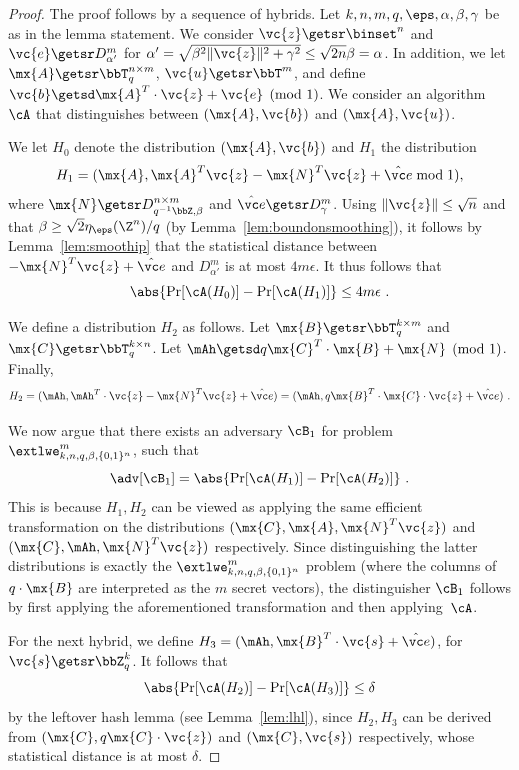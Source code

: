 \begin{proof}
The proof follows by a sequence of hybrids. 
Let $k,n,m,q,\eps, \alpha, \beta, \gamma$ be as in the lemma statement. 
We consider $\vc{z} \getsr \binset^n$ and $\vc{e} \getsr D_{\alpha'}^m$ for $\alpha' = \sqrt{\beta^2\|\vc{z}\|^2+ \gamma^2} \le \sqrt{2n}\beta=\alpha$. In addition, we let $\mx{A}\getsr \bbT_q^{n \times m}$, $\vc{u} \getsr \bbT^m$, and define $\vc{b} \getsd \mx{A}^T\cdot\vc{z}+\vc{e}\pmod{1}$. We consider an algorithm~$\cA$ that distinguishes between $(\mx{A}, \vc{b})$ and $(\mx{A}, \vc{u})$.

We let $H_0$ denote the distribution $(\mx{A}, \vc{b})$ and $H_1$ the distribution 
\[ H_1 = (\mx{A}, \mx{A}^T\vc{z}-\mx{N}^T\vc{z}+\veh \bmod 1 ),\]
where $\mx{N}\getsr D^{n \times m}_{q^{-1}\bbZ, \beta}$ and $\veh \getsr D_{\gamma}^m$.
Using $\| \vc{z} \| \le \sqrt{n}$ and that $\beta \ge \sqrt{2} \eta_\eps(\Z^n)/q$ (by Lemma~\ref{lem:boundonsmoothing}), it follows by Lemma~\ref{lem:smoothip} that the statistical distance between $-\mx{N}^T\vc{z}+\veh$ and $D^m_{\alpha'}$ is at most $4 m \epsilon$.
It thus follows that
\begin{equation}\label{eq:h0}
\abs{\Pr[\cA(H_0)] - \Pr[\cA(H_1)]} \le 4m\epsilon~.
\end{equation}


We define a distribution $H_2$ as follows. Let $\mx{B} \getsr \bbT_q^{k \times m}$ and $\mx{C} \getsr \bbT_q^{k \times n}$.
Let $\mAh \getsd q\mx{C}^T\cdot \mx{B} + \mx{N}\pmod{1}$. Finally,
\[
H_2 = (\mAh, \mAh^T\cdot\vc{z} - \mx{N}^T\vc{z}+\veh) = (\mAh, q\mx{B}^T\cdot \mx{C}\cdot\vc{z}+\veh)~.
\]

We now argue that there exists an adversary $\cB_1$ for problem $\extlwe^m_{k,n,q,\beta,\{0,1\}^n}$, such that
\begin{equation}\label{eq:h1}
\adv[\cB_1] = \abs{\Pr[\cA(H_1)]-\Pr[\cA(H_2)]}~.
\end{equation}
This is because $H_1, H_2$ can be viewed as applying the same efficient transformation on the distributions $(\mx{C}, \mx{A}, \mx{N}^T\vc{z})$ and $(\mx{C}, \mAh, \mx{N}^T\vc{z})$ respectively. Since distinguishing the latter distributions is exactly the $\extlwe^m_{k,n,q,\beta,\{0,1\}^n}$ problem (where the columns of $q\cdot\mx{B}$ are interpreted as the $m$ secret vectors), the distinguisher $\cB_1$ follows by first applying the aforementioned transformation and then applying~$\cA$.

For the next hybrid, we define $H_3 = (\mAh, \mx{B}^T\cdot \vc{s}+\veh)$, for $\vc{s} \getsr \bbZ_q^k$.
It follows that
\begin{equation}\label{eq:h2}
\abs{\Pr[\cA(H_2)]- \Pr[\cA(H_3)]} \le \delta
\end{equation}
by the leftover hash lemma (see Lemma~\ref{lem:lhl}), since $H_2, H_3$ can be derived from $(\mx{C}, q\mx{C}\cdot\vc{z})$ and $(\mx{C}, \vc{s})$ respectively, whose statistical distance is at most $\delta$.


\end{proof}
